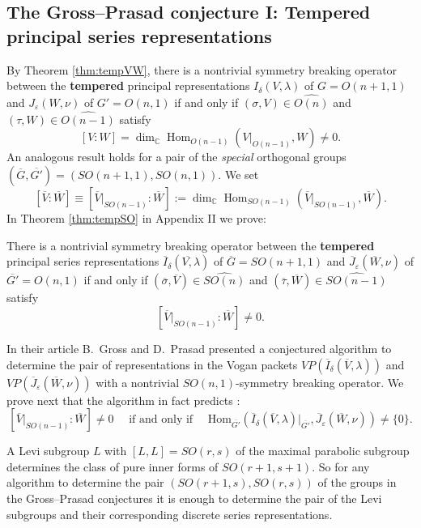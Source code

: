 \subsection{The Gross--Prasad conjecture I: Tempered principal series  representations}
\label{subsec:IV.4}

By Theorem \ref{thm:tempVW},
 there is a nontrivial  symmetry breaking operator
 between the {\bf{tempered}} principal representations ${I}_\delta(V,\lambda)$
 of $G=O(n+1,1)$
 and ${J}_\varepsilon(W,\nu)$ of $G'=O(n,1)$ 
 if and only if $(\sigma,V) \in \widehat{O(n)}$
 and $(\tau,W) \in \widehat {O(n-1)}$ satisfy 
\[
  [V:W]=\dim_{\mathbb{C}}{\operatorname{Hom}}_{O(n-1)}
                          (V|_{O(n-1)},W) \not = 0.  
\]
An analogous result holds 
 for a pair of the {\it{special}} orthogonal groups 
 $(\overline G, \overline {G'})=(SO(n+1,1),SO(n,1))$.  
We set
\[
   [\overline{V}: \overline{W}]
   \equiv
   [\overline{V}|_{SO(n-1)}: \overline{W}]
  :=
  \dim_{\mathbb{C}}
  {\operatorname{Hom}}_{SO(n-1)}
  (\overline{V}|_{SO(n-1)},\overline{W}).  
\]
In Theorem \ref{thm:tempSO} in Appendix II 
 we prove:
\begin{theorem}
There is a nontrivial  symmetry breaking operator
 between the {\bf{tempered}} principal series representations
 $\overline{I}_\delta(\overline{V,}\lambda)$
 of $\overline{G}=SO(n+1,1)$
 and $\overline{J}_\varepsilon(\overline{W},\nu)$ of $\overline{G'}=O(n,1)$ 
 if and only if $(\overline \sigma,\overline{V}) \in \widehat{SO(n)}$
 and $(\overline \tau,\overline{W}) \in \widehat {SO(n-1)}$ satisfy 
\[
   [\overline{V}|_{SO(n-1)}: \overline{W}] \not = 0.    
\]
\end{theorem}



In their article B.~Gross and D.~Prasad presented a conjectured algorithm
 to determine the pair of representations in the Vogan packets
 $VP(\overline{I}_\delta(\overline{V},\lambda))$
 and  $VP(\overline{J}_\varepsilon(\overline{W},\nu))$
 with a nontrivial $SO(n,1)$-symmetry breaking operator. We  prove next that  the algorithm in fact predicts :
\[ 
   [\overline{V}|_{SO(n-1)}: \overline{W}] \not = 0 
\quad
\text{ if and only if }
\quad
   \mbox{Hom}_{\overline{G'}} 
  (\overline{I}_\delta(\overline{V},\lambda)|_{\overline{G'}},
   \overline{J}_\varepsilon(\overline{W},\nu)) \not = \{0\}.
\]


\medskip
\begin{observation}
A Levi subgroup $L$ with
$[L,L] = SO(r,s)$ of the maximal parabolic subgroup determines the class
 of pure inner forms of $SO(r+1,s+1)$. 
So for any algorithm to determine the pair $(SO(r+1,s), SO(r,s))$ of the groups in the Gross--Prasad conjectures it is enough to  determine the pair  of the Levi subgroups and their corresponding discrete series representations.
\end{observation}
\medskip

